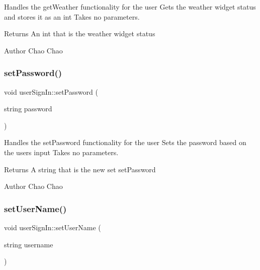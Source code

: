 Handles the get\+Weather functionality for the user  Gets the weather widget status and stores it as an int  Takes no parameters. 

\begin{DoxyReturn}{Returns}
An int that is the weather widget status 
\end{DoxyReturn}
\begin{DoxyAuthor}{Author}
Chao Chao 
\end{DoxyAuthor}
\mbox{\label{classuser_sign_in_abaff4cd88aa403e831a7126abb5d63f2}} 
\subsubsection{\texorpdfstring{set\+Password()}{setPassword()}}
{\footnotesize\ttfamily void user\+Sign\+In\+::set\+Password (\begin{DoxyParamCaption}\item[{string}]{password }\end{DoxyParamCaption})}



Handles the set\+Password functionality for the user  Sets the password based on the user\textquotesingle{}s input  Takes no parameters. 

\begin{DoxyReturn}{Returns}
A string that is the new set set\+Password 
\end{DoxyReturn}
\begin{DoxyAuthor}{Author}
Chao Chao 
\end{DoxyAuthor}
\mbox{\label{classuser_sign_in_a7128c36d84156e792b55c9df6acf1bc8}} 
\subsubsection{\texorpdfstring{set\+User\+Name()}{setUserName()}}
{\footnotesize\ttfamily void user\+Sign\+In\+::set\+User\+Name (\begin{DoxyParamCaption}\item[{string}]{username }\end{DoxyParamCaption})}



